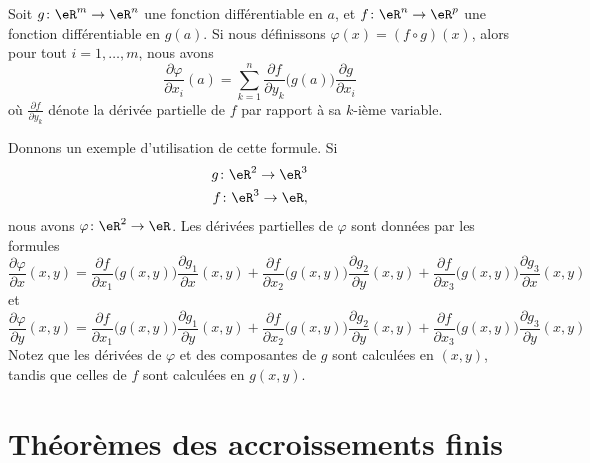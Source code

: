\begin{theorem}		\label{ThoDerDirFnComp}
	Soit $g\colon \eR^m\to \eR^n$ une fonction différentiable en $a$, et $f\colon \eR^n\to \eR^p$ une fonction différentiable en $g(a)$. Si nous définissons $\varphi(x)=(f\circ g)(x)$, alors pour tout $i=1,\ldots,m$, nous avons
	\begin{equation}
		\frac{ \partial \varphi }{ \partial x_i }(a)=\sum_{k=1}^n\frac{ \partial f }{ \partial y_k }\big( g(a) \big)\frac{ \partial g }{ \partial x_i }
	\end{equation}
	où $\frac{ \partial f }{ \partial y_k }$ dénote la dérivée partielle de $f$ par rapport à sa $k$-ième variable.
\end{theorem}

Donnons un exemple d'utilisation de cette formule. Si
\begin{equation}
	\begin{aligned}[]
		g\colon \eR^2\to \eR^3\\
		f\colon \eR^3\to \eR,
	\end{aligned}
\end{equation}
nous avons $\varphi\colon \eR^2\to \eR$. Les dérivées partielles de $\varphi$ sont données par les formules
\begin{equation}
	\frac{ \partial \varphi }{ \partial x }(x,y)=\frac{ \partial f }{ \partial x_1 }\big( g(x,y) \big)\frac{ \partial g_1 }{ \partial x }(x,y)+\frac{ \partial f }{ \partial x_2 }\big( g(x,y) \big)\frac{ \partial g_2 }{ \partial y }(x,y)+\frac{ \partial f }{ \partial x_3 }\big( g(x,y) \big)\frac{ \partial g_3 }{ \partial x }(x,y)
\end{equation}
et
\begin{equation}
	\frac{ \partial \varphi }{ \partial y }(x,y)=\frac{ \partial f }{ \partial x_1 }\big( g(x,y) \big)\frac{ \partial g_1 }{ \partial y }(x,y)+\frac{ \partial f }{ \partial x_2 }\big( g(x,y) \big)\frac{ \partial g_2 }{ \partial y }(x,y)+\frac{ \partial f }{ \partial x_3 }\big( g(x,y) \big)\frac{ \partial g_3 }{ \partial y }(x,y)
\end{equation}
Notez que les dérivées de $\varphi$ et des composantes de $g$ sont calculées en $(x,y)$, tandis que celles de $f$ sont calculées en $g(x,y)$.

\section{Théorèmes des accroissements finis}		\label{SecThoAccrsFinis}

